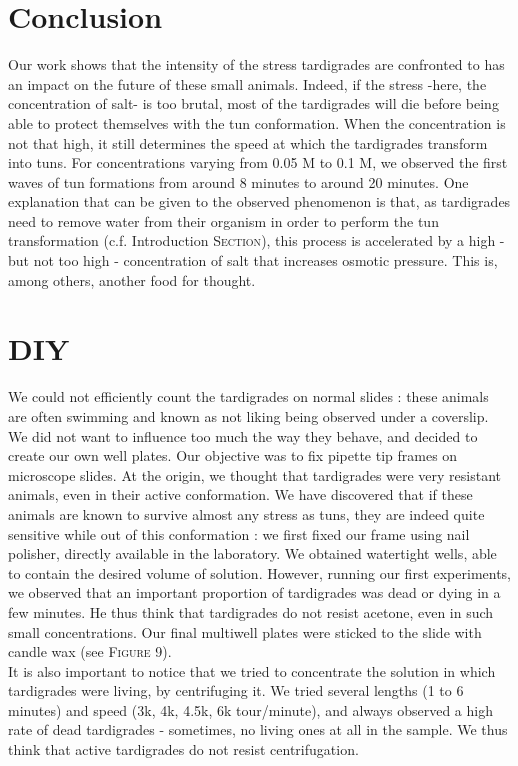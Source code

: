 \documentclass[12pt,a4paper, twocolumn]{article}
\begin{document}
\section*{Conclusion}
Our work shows that the intensity of the stress tardigrades are confronted to has an impact on the future of these small animals. Indeed, if the stress -here, the concentration of salt- is too brutal, most of the tardigrades will die before being able to protect themselves with the tun conformation. When the concentration is not that high, it still determines the speed at which the tardigrades transform into tuns. For concentrations varying from 0.05 M to  0.1 M, we observed the first waves of tun formations from around 8 minutes to around 20 minutes. One explanation that can be given to the observed phenomenon is that, as tardigrades need to remove water from their organism in order to perform the tun transformation (c.f. Introduction \textsc{Section}), this process is accelerated by a high - but not too high - concentration of salt that increases osmotic pressure. This is, among others, another food for thought.


\newpage


\section*{DIY}
We could not efficiently count the tardigrades on normal slides : these animals are often swimming and known as not liking being observed under a coverslip. We did not want to influence too much the way they behave, and decided to create our own well plates. Our objective was to fix pipette tip frames on microscope slides. At the origin, we thought that tardigrades were very resistant animals, even in their active conformation. We have discovered that if these animals are known to survive almost any stress as tuns, they are indeed quite sensitive while out of this conformation : we first fixed our frame using nail polisher, directly available in the laboratory. We obtained watertight wells, able to contain the desired volume of solution. However, running our first experiments, we observed that an important proportion of tardigrades was dead or dying in a few minutes. He thus think that tardigrades do not resist acetone, even in such small concentrations. Our final multiwell plates were sticked to the slide with candle wax (see \textsc{Figure} 9).\\

It is also important to notice that we tried to concentrate the solution in which tardigrades were living, by centrifuging it. We tried several lengths (1 to 6 minutes) and speed (3k, 4k, 4.5k, 6k tour/minute), and always observed a high rate of dead tardigrades - sometimes, no living ones at all in the sample. We thus think that active tardigrades do not resist centrifugation.
\end{document}
